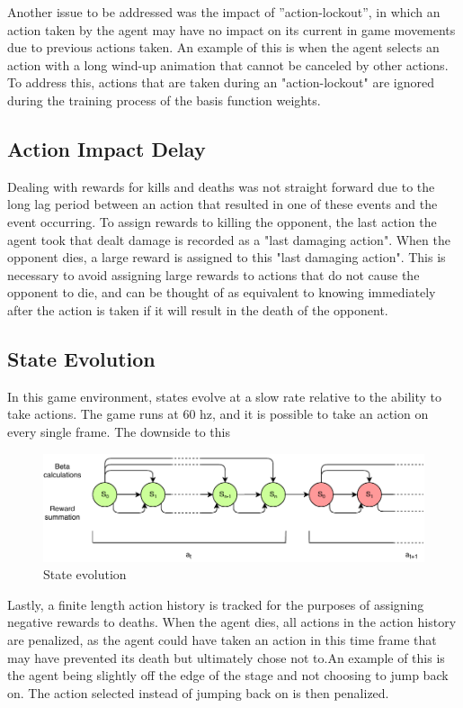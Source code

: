 Another issue to be addressed was the impact of ”action-lockout”, in which an action taken by the agent may have no impact on its current in game movements due to previous actions taken. An example of this is when the agent selects an action with a long wind-up animation that cannot be canceled by other actions. To address this, actions that are taken during an "action-lockout" are ignored during the training process of the basis function weights. 

\subsection{Action Impact Delay}

Dealing with rewards for kills and deaths was not straight forward due to the long lag period between an action that resulted in one of these events and the event occurring. To assign rewards to killing the opponent, the last action the agent took that dealt damage is recorded as a "last damaging action". When the opponent dies, a large reward is assigned to this "last damaging action". This is necessary to avoid assigning large rewards to actions that do not cause the opponent to die, and can be thought of as equivalent to knowing immediately after the action is taken if it will result in the death of the opponent.

\subsection{State Evolution}
In this game environment, states evolve at a slow rate relative to the ability to take actions. The game runs at 60 hz, and it is possible to take an action on every single frame. The downside to this 


\begin{figure}[!htb]
	\centering
	\includegraphics[width=120mm]{stateevolution.pdf}
	\caption{State evolution}
\end{figure}

Lastly, a finite length action history is tracked for the purposes of assigning negative rewards to deaths. When the agent dies, all actions in the action history are penalized, as the agent could have taken an action in this time frame that may have prevented its death but ultimately chose not to.An example of this is the agent being slightly off the edge of the stage and not choosing to jump back on. The action selected instead of jumping back on is then penalized.

